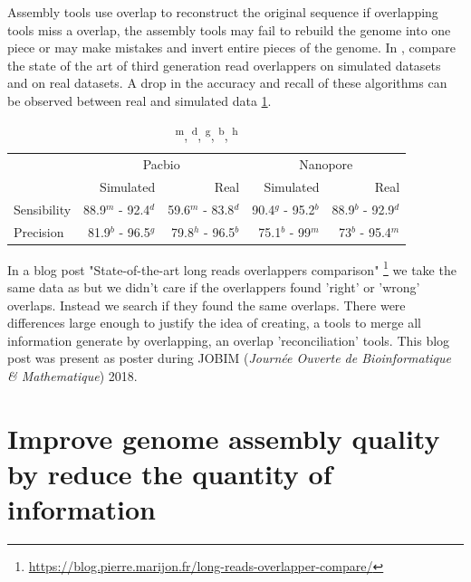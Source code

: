 \documentclass[main.tex]{subfiles}
\begin{document}
Assembly tools use overlap to reconstruct the original sequence if overlapping tools miss a overlap, the assembly tools may fail to rebuild the genome into one piece or may make mistakes and invert entire pieces of the genome. In \cite{ovl_bench}, \citeauthor{ovl_bench} compare the state of the art of third generation read overlappers on simulated datasets and on real datasets. A drop in the accuracy and recall of these algorithms can be observed between real and simulated data \ref{preassembly:tab:ovl_result}.

\begin{table}[ht]
    \centering
    \begin{tabular}{l|rr|rr}
                & \multicolumn{2}{c}{Pacbio}                & \multicolumn{2}{c}{Nanopore}              \\ 
                & Simulated           & Real                & Simulated         & Real                  \\ \hline
    Sensibility & 88.9$^m$ - 92.4$^d$ & 59.6$^m$ - 83.8$^d$ & 90.4$^g$ - 95.2$^b$ & 88.9$^b$ - 92.9$^d$ \\
    Precision   & 81.9$^b$ - 96.5$^g$ & 79.8$^h$ - 96.5$^b$ & 75.1$^b$ - 99$^m$   & 73$^b$ - 95.4$^m$   \\
    \end{tabular}
    \caption{\textsuperscript{m}, \textsuperscript{d}, \textsuperscript{g}, \textsuperscript{b}, \textsuperscript{h}\mhap}
    \label{preassembly:tab:ovl_result}
\end{table}

In a blog post "State-of-the-art long reads overlappers comparison" \footnote{\url{https://blog.pierre.marijon.fr/long-reads-overlapper-compare/}} we take the same data as \cite{ovl_bench} but we didn't care if the overlappers found 'right' or 'wrong' overlaps. Instead we search if they found the same overlaps. There were differences large enough to justify the idea of creating, a tools to merge all information generate by overlapping, an overlap 'reconciliation' tools. This blog post was present as poster during JOBIM (\textit{Journée Ouverte de Bioinformatique \& Mathematique}) 2018.




\section{Improve genome assembly quality by reduce the quantity of information} \label{sec:preasm:intro_fpa}
\end{document}
